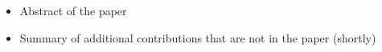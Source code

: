 
\begin{itemize}
\item Abstract of the paper
    \item Summary of additional contributions that are not in the paper (shortly)
\end{itemize}


 